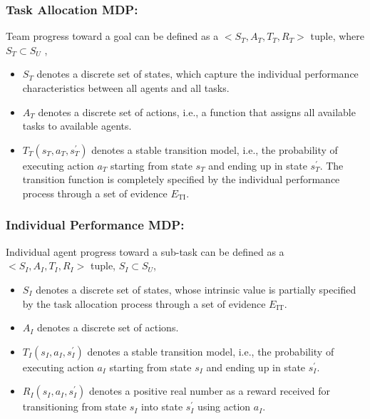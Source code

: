 \documentclass[]{article}
\begin{document}
\subsubsection{Task Allocation MDP:}\label{task-allocation-mdp}

Team progress toward a goal can be defined as a
\(< S_{T},A_{T},T_{T},R_{T} >\) tuple, where\(S_{T} \subset S_{U}\) ,

\begin{itemize}
\item
  \(S_{T}\) denotes a discrete set of states, which capture the
  individual performance characteristics between all agents and all
  tasks.
\item
  \(A_{T}\) denotes a discrete set of actions, i.e., a function that
  assigns all available tasks to available agents.
\item
  \(T_{T}\left( s_{T},a_{T},s_{T}^{'} \right)\) denotes a stable
  transition model, i.e., the probability of executing action \(a_{T}\)
  starting from state \(s_{T}\) and ending up in state \(s_{T}^{'}\).
  The transition function is completely specified by the individual
  performance process through a set of evidence \(E_{\text{TI}}\).
\end{itemize}

\subsubsection{Individual Performance
MDP:}\label{individual-performance-mdp}

Individual agent progress toward a sub-task can be defined as a
\(< S_{I},A_{I},T_{I},R_{I} >\) tuple, \(S_{I} \subset S_{U}\),

\begin{itemize}
\item
  \(S_{I}\) denotes a discrete set of states, whose intrinsic value is
  partially specified by the task allocation process through a set of
  evidence \(E_{\text{IT}}\).
\item
  \(A_{I}\) denotes a discrete set of actions.
\item
  \(T_{I}\left( s_{I},a_{I},s_{I}^{'} \right)\) denotes a stable
  transition model, i.e., the probability of executing action \(a_{I}\)
  starting from state \(s_{I}\) and ending up in state \(s_{I}^{'}\).
\item
  \(R_{I}(s_{I},a_{I},s_{I}^{'})\) denotes a positive real number as a
  reward received for transitioning from state \(s_{I}\) into state
  \(s_{I}^{'}\) using action \(a_{I}\).
\end{itemize}
\end{document}
